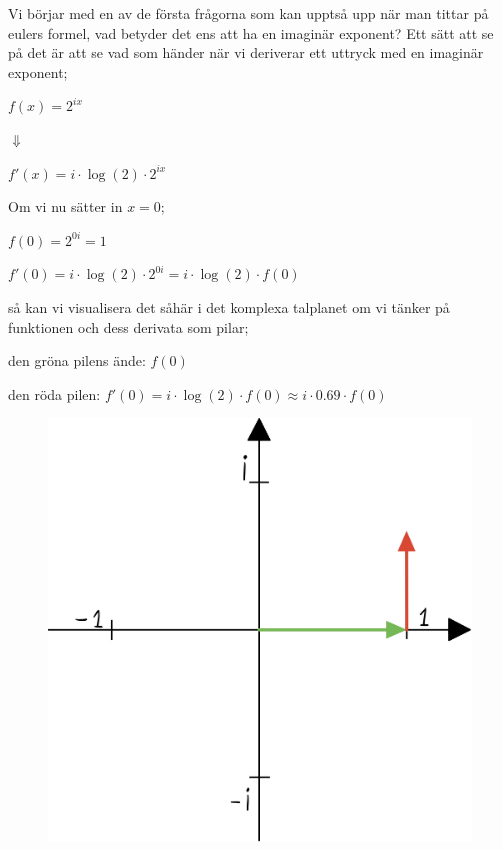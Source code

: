 \documentclass[10pt, a4paper]{amsart}
\begin{document}
Vi börjar med en av de första frågorna som kan upptså upp när man tittar på eulers formel, vad betyder det ens att ha en imaginär exponent?
Ett sätt att se på det är att se vad som händer när vi deriverar ett uttryck med en imaginär exponent;
\bigskip

\bigskip
\hspace{5ex}
$ f(x) = 2^{ix} $

\hspace{10ex}
$ \Downarrow $

\hspace{5ex}
$ f'(x) = i \cdot \log(2) \cdot 2^{ix} $
\bigskip
\bigskip

Om vi nu sätter in $ x = 0 $;
\bigskip

\bigskip
\hspace{5ex}
$ f(0) = 2^{0i} = 1 $

\hspace{5ex}
$ f'(0) = i \cdot \log(2) \cdot 2^{0i} = i \cdot \log(2) \cdot f(0) $
\bigskip
\bigskip

så kan vi visualisera det såhär i det komplexa talplanet om vi tänker på funktionen och dess derivata som pilar;
\bigskip

\bigskip
\hspace{5ex}
den gröna pilens ände: $ f(0) $

\hspace{5ex}
den röda pilen: $ f'(0) = i \cdot \log(2) \cdot f(0) \approx i \cdot 0.69 \cdot f(0) $

\bigskip
\begin{figure}[H]
    \includegraphics[width=50ex]{photos/chapter2/1.jpg}
\end{figure}
\end{document}
